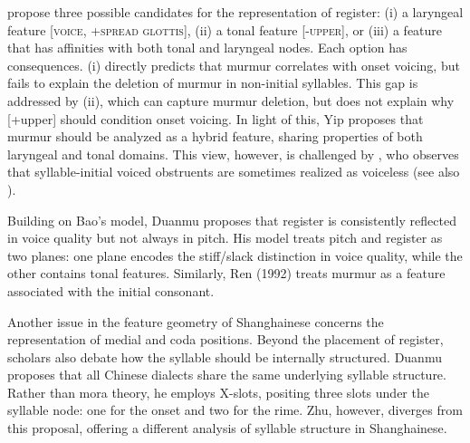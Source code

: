 \documentclass[11pt]{article}
\begin{document}
\citet{yip1993tonal} propose three possible candidates for the representation 
of register: (i) a laryngeal feature \textsc{[voice, +spread glottis]}, (ii) a 
tonal feature \textsc{[-upper]}, or (iii) a feature that has affinities with 
both tonal and laryngeal nodes. Each option has consequences. (i) directly 
predicts that murmur correlates with onset voicing, but fails to explain the 
deletion of murmur in non-initial syllables. This gap is addressed by (ii), 
which can capture murmur deletion, but does not explain why [+upper] should 
condition onset voicing. In light of this, Yip proposes that murmur should be 
analyzed as a hybrid feature, sharing properties of both laryngeal and tonal 
domains. This view, however, is challenged by \citet{zhu1999shanghai}, who 
observes that syllable-initial voiced obstruents are sometimes realized as 
voiceless (see also \citet{chen2015shanghai}).

Building on Bao’s model, Duanmu proposes that register is consistently reflected in voice quality but not always in pitch. His model treats pitch and register as two planes: one plane encodes the stiff/slack distinction in voice quality, while the other contains tonal features. Similarly, Ren (1992) treats murmur as a feature associated with the initial consonant.

Another issue in the feature geometry of Shanghainese concerns the representation of medial and coda positions. Beyond the placement of register, scholars also debate how the syllable should be internally structured. Duanmu proposes that all Chinese dialects share the same underlying syllable structure. Rather than mora theory, he employs X-slots, positing three slots under the syllable node: one for the onset and two for the rime. Zhu, however, diverges from this proposal, offering a different analysis of syllable structure in Shanghainese.
\end{document}
